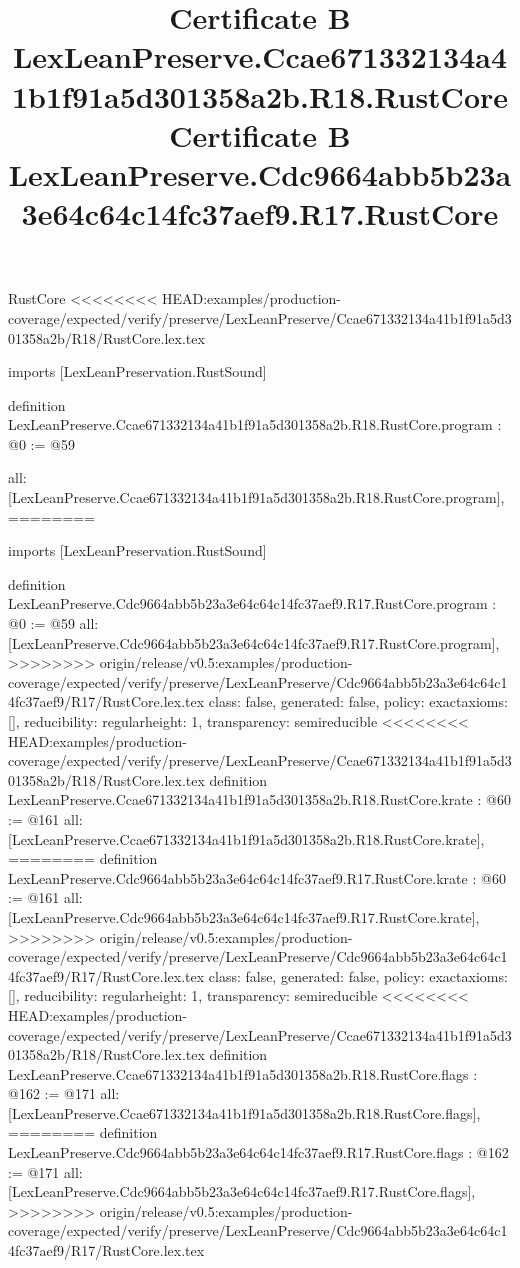 \begin{lexlean}{RustCore}
<<<<<<<< HEAD:examples/production-coverage/expected/verify/preserve/LexLeanPreserve/Ccae671332134a41b1f91a5d301358a2b/R18/RustCore.lex.tex
\title{Certificate B LexLeanPreserve.Ccae671332134a41b1f91a5d301358a2b.R18.RustCore}
\begin{coremodule}
imports [LexLeanPreservation.RustSound]

definition LexLeanPreserve.Ccae671332134a41b1f91a5d301358a2b.R18.RustCore.program : @0 := @59 {
  all: [LexLeanPreserve.Ccae671332134a41b1f91a5d301358a2b.R18.RustCore.program],
========
\title{Certificate B LexLeanPreserve.Cdc9664abb5b23a3e64c64c14fc37aef9.R17.RustCore}
\begin{coremodule}
imports [LexLeanPreservation.RustSound]

definition LexLeanPreserve.Cdc9664abb5b23a3e64c64c14fc37aef9.R17.RustCore.program : @0 := @59 {
  all: [LexLeanPreserve.Cdc9664abb5b23a3e64c64c14fc37aef9.R17.RustCore.program],
>>>>>>>> origin/release/v0.5:examples/production-coverage/expected/verify/preserve/LexLeanPreserve/Cdc9664abb5b23a3e64c64c14fc37aef9/R17/RustCore.lex.tex
  class: false,
  generated: false,
  policy: exact{axioms: []},
  reducibility: regular{height: 1},
  transparency: semireducible
}
<<<<<<<< HEAD:examples/production-coverage/expected/verify/preserve/LexLeanPreserve/Ccae671332134a41b1f91a5d301358a2b/R18/RustCore.lex.tex
definition LexLeanPreserve.Ccae671332134a41b1f91a5d301358a2b.R18.RustCore.krate : @60 := @161 {
  all: [LexLeanPreserve.Ccae671332134a41b1f91a5d301358a2b.R18.RustCore.krate],
========
definition LexLeanPreserve.Cdc9664abb5b23a3e64c64c14fc37aef9.R17.RustCore.krate : @60 := @161 {
  all: [LexLeanPreserve.Cdc9664abb5b23a3e64c64c14fc37aef9.R17.RustCore.krate],
>>>>>>>> origin/release/v0.5:examples/production-coverage/expected/verify/preserve/LexLeanPreserve/Cdc9664abb5b23a3e64c64c14fc37aef9/R17/RustCore.lex.tex
  class: false,
  generated: false,
  policy: exact{axioms: []},
  reducibility: regular{height: 1},
  transparency: semireducible
}
<<<<<<<< HEAD:examples/production-coverage/expected/verify/preserve/LexLeanPreserve/Ccae671332134a41b1f91a5d301358a2b/R18/RustCore.lex.tex
definition LexLeanPreserve.Ccae671332134a41b1f91a5d301358a2b.R18.RustCore.flags : @162 := @171 {
  all: [LexLeanPreserve.Ccae671332134a41b1f91a5d301358a2b.R18.RustCore.flags],
========
definition LexLeanPreserve.Cdc9664abb5b23a3e64c64c14fc37aef9.R17.RustCore.flags : @162 := @171 {
  all: [LexLeanPreserve.Cdc9664abb5b23a3e64c64c14fc37aef9.R17.RustCore.flags],
>>>>>>>> origin/release/v0.5:examples/production-coverage/expected/verify/preserve/LexLeanPreserve/Cdc9664abb5b23a3e64c64c14fc37aef9/R17/RustCore.lex.tex
}}}
\end{coremodule}}
\end{coremodule}
\end{lexlean}
